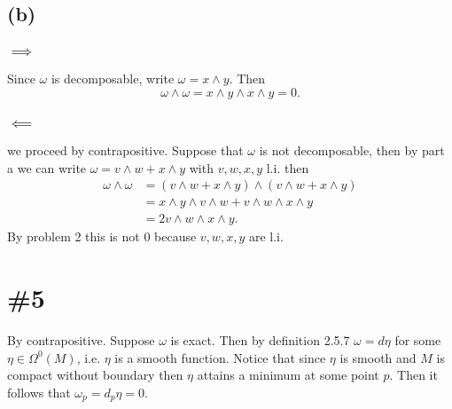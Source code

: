\documentclass{article}
\begin{document}
\subsection*{(b)}
\subsubsection*{$\implies$}
Since $\omega$ is decomposable, write $\omega=x\wedge y$. Then
\[
	\omega\wedge\omega=x\wedge y\wedge x\wedge y=0.
\]
\subsubsection*{$\impliedby$}
we proceed by contrapositive. Suppose that $\omega$ is not decomposable, then
by part a we can write $\omega=v\wedge w+x\wedge y$ with $v,w,x,y$ l.i. then
\begin{align*}
	\omega\wedge\omega&=\left(v\wedge w+x\wedge y\right)\wedge \left(v\wedge w+x\wedge y\right)\\
	&=x\wedge y \wedge v \wedge w + v \wedge w \wedge x\wedge y\\
	&=2v \wedge w \wedge x\wedge y.
\end{align*}
By problem 2 this is not 0 because $v,w,x,y$ are l.i.

\section*{\#5}

By contrapositive. Suppose $\omega$ is exact. Then by definition 2.5.7
$\omega=d\eta$ for some $\eta\in\Omega^0(M)$, i.e. $\eta$ is a smooth function. Notice that since $\eta$ is smooth and $M$ is compact without boundary then $\eta$ attains a minimum at some point $p$. Then it follows that $\omega_p=d_p\eta=0$.
\end{document}
